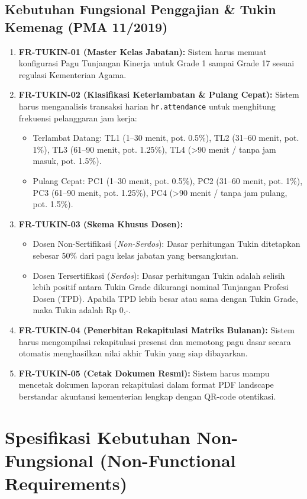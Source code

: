 \documentclass[12pt,a4paper]{article}
\begin{document}
\subsection{Kebutuhan Fungsional Penggajian \& Tukin Kemenag (PMA 11/2019)}
\begin{enumerate}
    \item \textbf{FR-TUKIN-01 (Master Kelas Jabatan):} Sistem harus memuat konfigurasi Pagu Tunjangan Kinerja untuk Grade 1 sampai Grade 17 sesuai regulasi Kementerian Agama.
    \item \textbf{FR-TUKIN-02 (Klasifikasi Keterlambatan \& Pulang Cepat):} Sistem harus menganalisis transaksi harian \texttt{hr.attendance} untuk menghitung frekuensi pelanggaran jam kerja:
    \begin{itemize}
        \item Terlambat Datang: TL1 (1--30 menit, pot. 0.5\%), TL2 (31--60 menit, pot. 1\%), TL3 (61--90 menit, pot. 1.25\%), TL4 (>90 menit / tanpa jam masuk, pot. 1.5\%).
        \item Pulang Cepat: PC1 (1--30 menit, pot. 0.5\%), PC2 (31--60 menit, pot. 1\%), PC3 (61--90 menit, pot. 1.25\%), PC4 (>90 menit / tanpa jam pulang, pot. 1.5\%).
    \end{itemize}
    \item \textbf{FR-TUKIN-03 (Skema Khusus Dosen):}
    \begin{itemize}
        \item Dosen Non-Sertifikasi (\textit{Non-Serdos}): Dasar perhitungan Tukin ditetapkan sebesar 50\% dari pagu kelas jabatan yang bersangkutan.
        \item Dosen Tersertifikasi (\textit{Serdos}): Dasar perhitungan Tukin adalah selisih lebih positif antara Tukin Grade dikurangi nominal Tunjangan Profesi Dosen (TPD). Apabila TPD lebih besar atau sama dengan Tukin Grade, maka Tukin adalah Rp 0,-.
    \end{itemize}
    \item \textbf{FR-TUKIN-04 (Penerbitan Rekapitulasi Matriks Bulanan):} Sistem harus mengompilasi rekapitulasi presensi dan memotong pagu dasar secara otomatis menghasilkan nilai akhir Tukin yang siap dibayarkan.
    \item \textbf{FR-TUKIN-05 (Cetak Dokumen Resmi):} Sistem harus mampu mencetak dokumen laporan rekapitulasi dalam format PDF landscape berstandar akuntansi kementerian lengkap dengan QR-code otentikasi.
\end{enumerate}

\section{Spesifikasi Kebutuhan Non-Fungsional (Non-Functional Requirements)}
\end{document}
